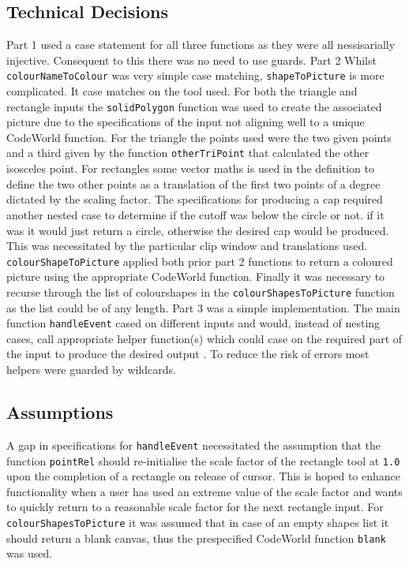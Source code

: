 \documentclass[11pt]{article}
\begin{document}
\subsection{Technical Decisions}
Part 1 used a case statement for all three functions as they were all nessisarially injective. Consequent to this there was no need to use guards.
 Part 2 Whilst \verb|colourNameToColour| was  very simple case matching, \verb|shapeToPicture| is more complicated. It case matches on the tool used. For both the triangle and rectangle inputs the \verb|solidPolygon| function was used to create the associated picture due to the specifications of the input not aligning well to a unique CodeWorld function. For the triangle the points used were the two given points and a third given by the function \verb|otherTriPoint| that calculated the other isosceles point. For rectangles some vector maths is used in the definition to define the two other points as a translation of the first two points of a degree dictated by the scaling factor. The specifications for producing a cap required another nested case to determine if the cutoff was below the circle or not. if it was it would just return a circle, otherwise the desired cap would be produced. This was necessitated by the particular clip window and translations used. \verb|colourShapeToPicture| applied both prior part 2 functions to return a coloured picture using the appropriate CodeWorld function. Finally it was necessary to recurse through the list of colourshapes in the \verb|colourShapesToPicture| function as the list could be of any length.
 Part 3 was a simple implementation. The main function \verb|handleEvent| cased on different inputs and would, instead of nesting cases, call appropriate helper function(s) which could case on the required part of the input to produce the desired output .  To reduce the risk of errors most helpers were guarded by wildcards.

\subsection{Assumptions}%
A gap in specifications for \verb|handleEvent| necessitated the assumption that the function \verb|pointRel| should re-initialise the scale factor of the rectangle tool at \verb|1.0| upon the completion of a rectangle on release of cursor. This is hoped to enhance functionality when a user has used an extreme value of the scale factor and wants to quickly return to a reasonable scale factor for the next rectangle input. For \verb|colourShapesToPicture| it was assumed that in case of an empty shapes list it should return a blank canvas, thus the prespecified CodeWorld function \verb|blank| was used.
\end{document}
